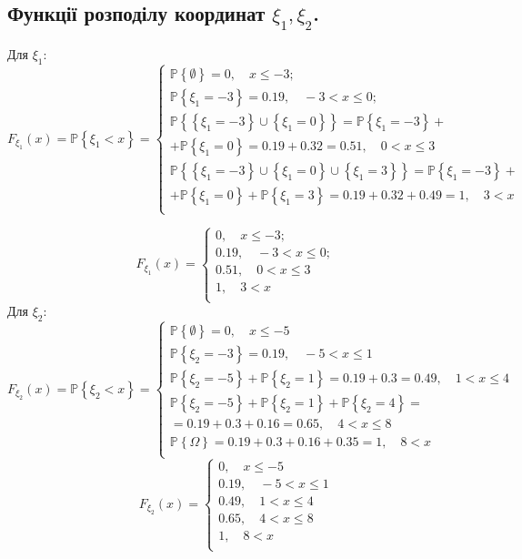 \documentclass[14pt,a4paper]{scrartcl}
\theoremstyle{definition}
\theoremstyle{remark}
\theoremstyle{definition}
\theoremstyle{definition}
\begin{document}
\subsection{Функції розподілу координат $\xi_1, \xi_2$.}
Для $\xi_1:$
$$F_{\xi_1}(x) = \mathbb{P} \left\lbrace \xi_1 < x \right\rbrace =
\begin{cases}
	\mathbb{P} \left\lbrace \emptyset \right\rbrace  = 0,\quad x \leq -3;\\
	\mathbb{P} \left\lbrace \xi_1 = -3 \right\rbrace = 0.19,\quad -3 < x \leq 0;\\
	\mathbb{P} \left\lbrace \left\lbrace \xi_1 =-3 \right\rbrace \cup \left\lbrace \xi_1 = 0 \right\rbrace   \right\rbrace =
	\mathbb{P} \left\lbrace\xi_1 =-3   \right\rbrace +\\ +	\mathbb{P} \left\lbrace \xi_1 = 0 \right\rbrace   = 0.19 + 0.32 = 0.51,\quad 0 < x \leq 3  \\
	\mathbb{P} \left\lbrace \left\lbrace \xi_1 =-3 \right\rbrace \cup \left\lbrace \xi_1 = 0 \right\rbrace \cup \left\lbrace \xi_1 = 3 \right\rbrace   \right\rbrace =
	\mathbb{P} \left\lbrace\xi_1 =-3   \right\rbrace +\\ +	\mathbb{P} \left\lbrace \xi_1 = 0 \right\rbrace+	\mathbb{P} \left\lbrace \xi_1 = 3 \right\rbrace   = 0.19 + 0.32 + 0.49= 1,\quad 3 < x \\
\end{cases} $$

$$F_{\xi_1}(x) =
\begin{cases}
	0,\quad x \leq -3;\\
	0.19,\quad -3 < x \leq 0;\\
	0.51,\quad 0 < x \leq 3  \\
	1,\quad 3 < x \\
\end{cases} $$
Для $\xi_2:$
$$F_{\xi_2}(x) = \mathbb{P} \left\lbrace \xi_2 < x \right\rbrace =
\begin{cases}
	\mathbb{P} \left\lbrace \emptyset \right\rbrace = 0, \quad x \leq -5\\
	\mathbb{P} \left\lbrace \xi_2 = -3 \right\rbrace = 0.19, \quad -5 < x \leq 1\\
	\mathbb{P} \left\lbrace \xi_2 = -5  \right\rbrace + \mathbb{P} \left\lbrace \xi_2 = 1 \right\rbrace = 0.19 + 0.3 = 0.49, \quad  1 < x \leq 4\\
		\mathbb{P} \left\lbrace \xi_2 = -5  \right\rbrace + \mathbb{P} \left\lbrace \xi_2 = 1 \right\rbrace + \mathbb{P} \left\lbrace \xi_2 = 4 \right\rbrace =\\= 0.19 + 0.3 + 0.16= 0.65, \quad  4 < x \leq 8\\
	 \mathbb{P} \left\lbrace \Omega \right\rbrace= 0.19 + 0.3 + 0.16 + 0.35= 1, \quad  8 < x \\
\end{cases} $$
$$F_{\xi_2}(x) =
\begin{cases}
	0, \quad x \leq -5\\
	0.19, \quad -5 < x \leq 1\\
  0.49, \quad  1 < x \leq 4\\
	0.65, \quad  4 < x \leq 8\\
	1, \quad  8 < x \\
\end{cases} $$
\end{document}
